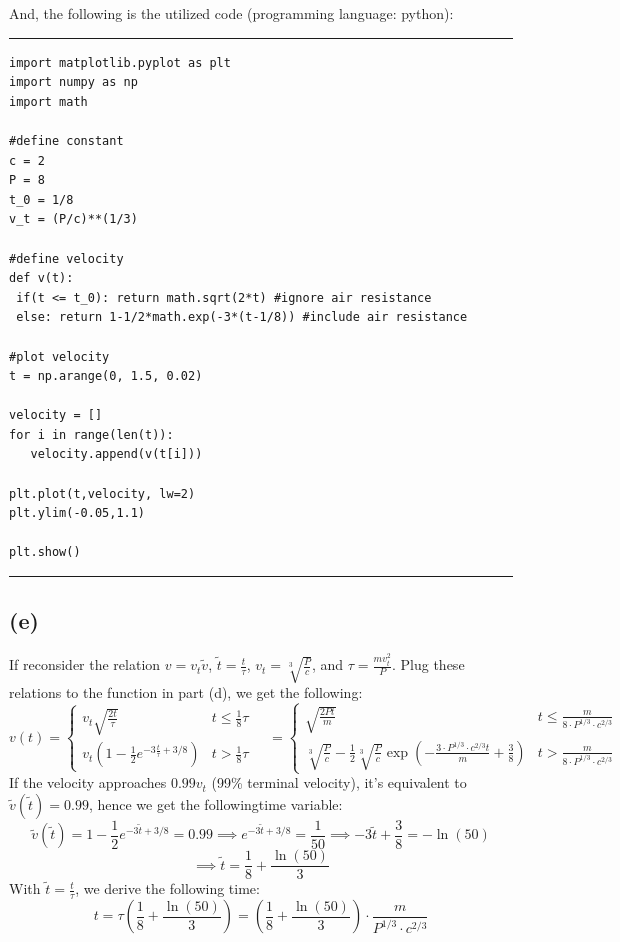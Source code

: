 \documentclass{article}
\begin{document}
And, the following is the utilized code (programming language: python):

\rule{15.24cm}{0.01mm}
\begin{verbatim}
import matplotlib.pyplot as plt
import numpy as np
import math

#define constant
c = 2
P = 8
t_0 = 1/8
v_t = (P/c)**(1/3)

#define velocity
def v(t):
 if(t <= t_0): return math.sqrt(2*t) #ignore air resistance
 else: return 1-1/2*math.exp(-3*(t-1/8)) #include air resistance

#plot velocity
t = np.arange(0, 1.5, 0.02)

velocity = []
for i in range(len(t)):
   velocity.append(v(t[i]))

plt.plot(t,velocity, lw=2)
plt.ylim(-0.05,1.1)

plt.show()
\end{verbatim}

\rule{15.24cm}{0.01mm}

\subsection*{(e)}
If reconsider the relation $v = v_t\tilde{v}$, $\tilde{t}=\frac{t}{\tau}$, $v_t=\sqrt[3]{\frac{P}{c}}$, and $\tau = \frac{mv_t^2}{P}$. Plug these relations to the function in part (d), we get the following:
$$v(t) = \begin{cases}
    v_t\sqrt{\frac{2t}{\tau}} & t\leq \frac{1}{8}\tau\\
    v_t\left(1-\frac{1}{2}e^{-3\frac{t}{\tau}+3/8}\right) & t>\frac{1}{8}\tau
\end{cases}\quad = \begin{cases}
    \sqrt{\frac{2Pt}{m}} & t\leq \frac{m}{8\cdot P^{1/3}\cdot c^{2/3}}\\
    \sqrt[3]{\frac{P}{c}}-\frac{1}{2}\sqrt[3]{\frac{P}{c}}\exp\left(-\frac{3\cdot P^{1/3}\cdot c^{2/3}t}{m}+\frac{3}{8}\right) & t>\frac{m}{8\cdot P^{1/3}\cdot c^{2/3}}
\end{cases}$$
If the velocity approaches $0.99 v_t$ (99\% terminal velocity), it's equivalent to $\tilde{v}(\tilde{t}) = 0.99$, hence we get the followingtime variable:
$$\tilde{v}(\tilde{t})=1-\frac{1}{2}e^{-3\tilde{t}+3/8} = 0.99 \implies e^{-3\tilde{t}+3/8} = \frac{1}{50}\implies -3\tilde{t}+\frac{3}{8}=-\ln(50)$$
$$\implies \tilde{t} = \frac{1}{8}+\frac{\ln(50)}{3}$$
With $\tilde{t} = \frac{t}{\tau}$, we derive the following time:
$$t = \tau\left(\frac{1}{8}+\frac{\ln(50)}{3}\right) = \left(\frac{1}{8}+\frac{\ln(50)}{3}\right)\cdot \frac{m}{P^{1/3}\cdot c^{2/3}}$$
\end{document}
